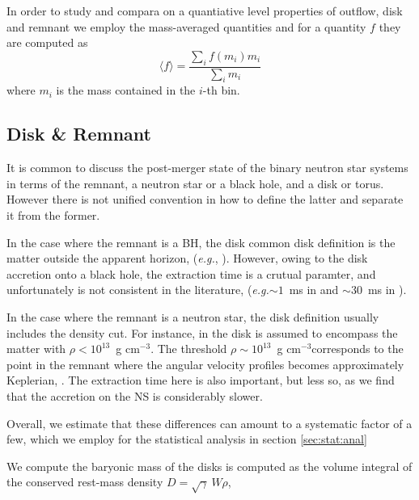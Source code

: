 \documentclass[11pt,a4paper,headinclude=true,DIV=14,BCOR=8mm,chapterprefix,listof=totoc,twoside,openright,abstracton]{scrbook}
\newcommand{\gcm}{g cm$^{-3}$}
\newcommand{\eg}{\textit{e.g.}}
\begin{document}
In order to study and compara on a quantiative level properties of outflow, disk and remnant we employ the mass-averaged quantities and for a quantity $f$ they are computed as 
\begin{equation}
    \langle f \rangle = \frac{\sum_i f(m_i)m_i}{\sum_i m_i}
\end{equation}
where $m_i$ is the mass contained in the $i$-th bin.


\subsection{Disk \& Remnant}

It is common to discuss the post-merger state of the binary neutron star systems in terms of the remnant, a neutron star or a black hole, and a disk or torus. However there is not unified convention in how to define the latter and separate it from the former. 

In the case where the remnant is a BH, the disk common disk definition is the matter outside the apparent horizon, (\eg, \cite{Dietrich:2015iva,Dietrich:2016hky}). 
However, owing to the disk accretion onto a black hole, the extraction time is a crutual paramter, and unfortunately is not consistent in the literature, (\eg $\sim1$~ms in \cite{Dietrich:2015iva,Dietrich:2016hky} and $\sim30$~ms in \cite{Sekiguchi:2016bjd}).

In the case where the remnant is a neutron star, the disk definition usually includes the density cut. For instance, in \cite{Radice:2018pdn,Kiuchi:2019lls,Vincent:2019kor} the disk is assumed to encompass the matter with $\rho < 10^{13}$~\gcm. 
The threshold $\rho\sim 10^{13}$~\gcm corresponds to the point in the remnant where
the angular velocity profiles becomes approximately Keplerian, \citep[\eg][]{Shibata:2005ss,Shibata:2006nm,Hanauske:2016gia,Kastaun:2016elu}.
The extraction time here is also important, but less so, as we find that the accretion on the NS is considerably slower.

Overall, we estimate that these differences can amount to a systematic factor of a few,
which we employ for the statistical analysis in section \ref{sec:stat:anal}


We compute the baryonic mass of the disks is computed as the volume integral of the conserved rest-mass density $D=\sqrt{\gamma}~W\rho$,
\end{document}
